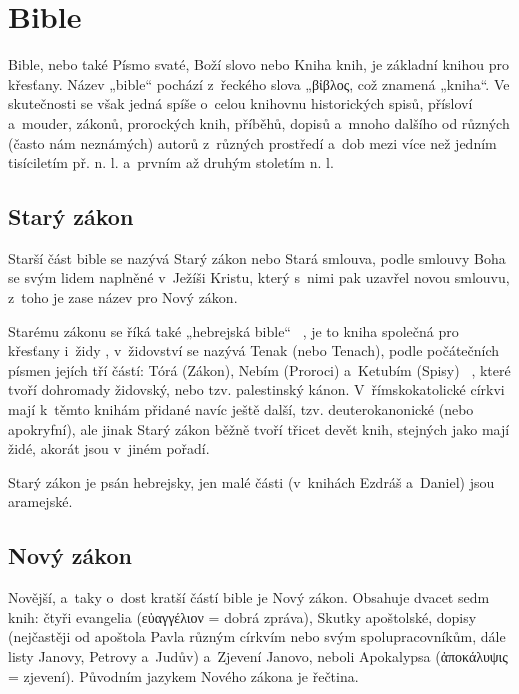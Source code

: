\documentclass[a4rpaper,11pt,oneside]{article}
\begin{document}


\section{Bible}

Bible, nebo také Písmo svaté, Boží slovo nebo Kniha knih, je základní knihou pro křesťany. Název „bible“ pochází z~řeckého slova „\textgreek{βἰβλος}, což znamená „kniha“. Ve skutečnosti se však jedná spíše o~celou knihovnu historických spisů, přísloví a~mouder, zákonů, prorockých knih, příběhů, dopisů a~mnoho dalšího od různých (často nám neznámých) autorů z~různých prostředí a~dob mezi více než jedním tisíciletím př. n. l. a~prvním až druhým stoletím n. l.

\subsection{Starý zákon}

Starší část bible se nazývá Starý zákon nebo Stará smlouva, podle smlouvy Boha se svým lidem naplněné v~Ježíši Kristu, který s~nimi pak uzavřel novou smlouvu, z~toho je zase název pro Nový zákon.

Starému zákonu se říká také „hebrejská bible“ ~\cite{online-bible}, je to kniha společná pro křesťany i~židy , v~židovství se nazývá Tenak (nebo Tenach), podle počátečních písmen jejích tří částí: Tórá (Zákon), Nebím (Proroci) a~Ketubím (Spisy) ~\cite[strana 17]{cep},  které tvoří dohromady židovský, nebo tzv. palestinský kánon. V~římskokatolické církvi  mají k~těmto knihám přidané navíc ještě další, tzv. deuterokanonické (nebo apokryfní), ale jinak Starý zákon běžně tvoří třicet devět knih, stejných jako mají židé, akorát jsou v~jiném pořadí.

Starý zákon je psán hebrejsky, jen malé části (v~knihách Ezdráš a~Daniel) jsou aramejské.

\subsection{Nový zákon}

Novější, a~taky o~dost kratší částí bible je Nový zákon. Obsahuje dvacet sedm knih: čtyři evangelia (\textgreek{εὐαγγέλιον} = dobrá zpráva), Skutky apoštolské, dopisy (nejčastěji od apoštola Pavla různým církvím nebo svým spolupracovníkům, dále listy Janovy, Petrovy a~Judův) a~Zjevení Janovo, neboli Apokalypsa (\textgreek{ἀποκάλυψις} = zjevení). Původním jazykem Nového zákona je řečtina.
\end{document}
